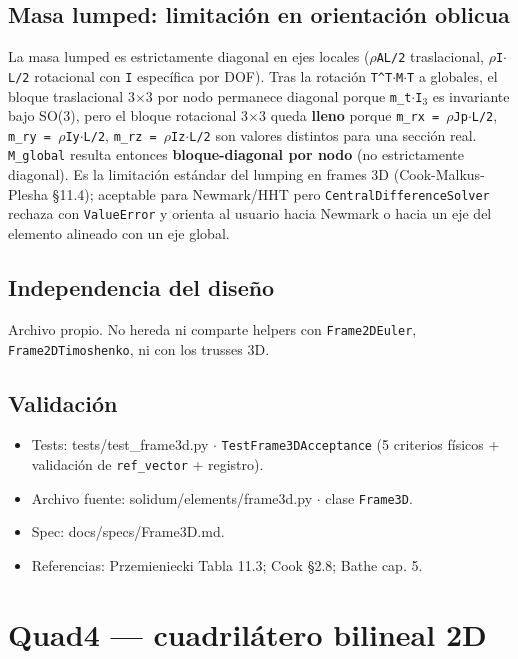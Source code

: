\documentclass[11pt,letterpaper,oneside]{report}
\begin{document}
\subsection{Masa lumped: limitación en orientación oblicua}
La masa lumped es estrictamente diagonal en ejes locales (\texttt{\ensuremath{\rho}AL/2} traslacional, \texttt{\ensuremath{\rho}I\ensuremath{\cdot}L/2} rotacional con \texttt{I} específica por DOF). Tras la rotación \texttt{T\textasciicircum{}T\ensuremath{\cdot}M\ensuremath{\cdot}T} a globales, el bloque traslacional 3\ensuremath{\times}3 por nodo permanece diagonal porque \texttt{m\_t\ensuremath{\cdot}I\ensuremath{_{3}}} es invariante bajo SO(3), pero el bloque rotacional 3\ensuremath{\times}3 queda \textbf{lleno} porque \texttt{m\_rx = \ensuremath{\rho}Jp\ensuremath{\cdot}L/2}, \texttt{m\_ry = \ensuremath{\rho}Iy\ensuremath{\cdot}L/2}, \texttt{m\_rz = \ensuremath{\rho}Iz\ensuremath{\cdot}L/2} son valores distintos para una sección real. \texttt{M\_global} resulta entonces \textbf{bloque-diagonal por nodo} (no estrictamente diagonal). Es la limitación estándar del lumping en frames 3D (Cook-Malkus-Plesha §11.4); aceptable para Newmark/HHT pero \texttt{CentralDifferenceSolver} rechaza con \texttt{ValueError} y orienta al usuario hacia Newmark o hacia un eje del elemento alineado con un eje global.

\subsection{Independencia del diseño}
Archivo propio. No hereda ni comparte helpers con \texttt{Frame2DEuler}, \texttt{Frame2DTimoshenko}, ni con los trusses 3D.

\subsection{Validación}
\begin{itemize}
  \item Tests: tests/test\_frame3d.py \ensuremath{\cdot} \texttt{TestFrame3DAcceptance} (5 criterios físicos + validación de \texttt{ref\_vector} + registro).
  \item Archivo fuente: solidum/elements/frame3d.py \ensuremath{\cdot} clase \texttt{Frame3D}.
  \item Spec: docs/specs/Frame3D.md.
  \item Referencias: Przemieniecki Tabla 11.3; Cook §2.8; Bathe cap. 5.
\end{itemize}


\section{Quad4 --- cuadrilátero bilineal 2D}
\end{document}
